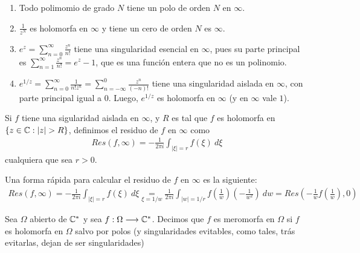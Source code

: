 \begin{obs}
\begin{enumerate}
              \begin{enumerate}
                  \item Todo polimomio de grado $N$ tiene un polo de orden $N$ en $\infty$.
                  \item $\frac{1}{z^N}$ es holomorfa en $\infty$ y tiene un cero de orden $N$ es $\infty$.
                  \item $e^z = \sum_{n=0}^{\infty}{\frac{z^n}{n!}}$ tiene una singularidad esencial en $\infty$, pues su parte principal es $\sum_{n=1}^{\infty}{\frac{z^n}{n!}} = e^z -1$, que es una función entera que no es un polinomio.
                  \item $e^{1/z} = \sum_{n=0}^{\infty}{\frac{1}{n!z^n}} = \sum_{n=-\infty}^{0}{\frac{z^n}{(-n)!}}$ tiene una singularidad aislada en $\infty$, con parte principal igual a $0$. Luego, $e^{1/z}$ es holomorfa en $\infty$ (y en $\infty$ vale $1$).
              \end{enumerate}
    \end{enumerate}
\end{obs}

\begin{defi}
    Si $f$ tiene una sigularidad aislada en $\infty$, y $R$ es tal que $f$ es holomorfa en $\{z \in \mathbb{C} : |z| > R\}$, definimos el residuo de $f$ en $\infty$ como
    \begin{align*}
        Res(f,\infty) = - \frac{1}{2\pi i}\int_{|\xi| = r}{f(\xi) \ d\xi}
    \end{align*}
    cualquiera que sea $r > 0$.
\end{defi}

\begin{obs}
    Una forma rápida para calcular el residuo de $f$ en $\infty$ es la siguiente:
    \begin{align*}
        Res(f,\infty) = - \frac{1}{2\pi i} \int_{|\xi| = r}{f(\xi) \ d\xi} \underset{\xi = 1/w}{=} \frac{1}{2\pi i}\int_{|w| = 1/r}{f\left(\frac{1}{w}\right)\left(-\frac{1}{w^2}\right) \ dw} = Res\left( -\frac{1}{w}f\left(\frac{1}{w} \right),0 \right)
    \end{align*}
\end{obs}

\begin{defi}
    Sea $\Omega$ abierto de $\mathbb{C}^*$ y sea $f: \Omega \longrightarrow \mathbb{C}^*$. Decimos que $f$ es meromorfa en $\Omega$ si $f$ es holomorfa en $\Omega$ salvo por polos (y singularidades evitables, como tales, trás evitarlas, dejan de ser singularidades)
\end{defi}


